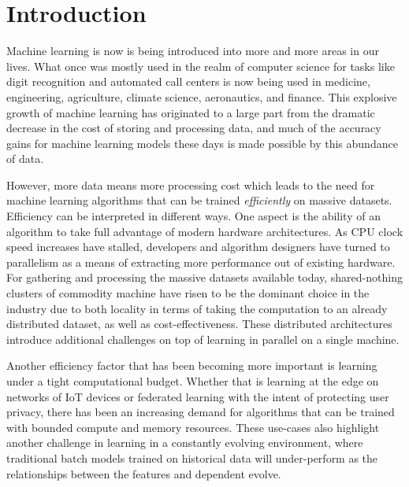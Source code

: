 \chapter{Introduction}

Machine learning is now is being introduced into more and more areas in
our lives. What once was mostly used in the realm of computer science for
tasks like digit recognition and automated call centers is now being used
in medicine, engineering, agriculture, climate science, aeronautics,
and finance. This explosive growth of machine learning has originated
to a large part from the dramatic decrease in the cost of storing and processing
data, and much of the accuracy gains for machine learning models these
days is made possible by this abundance of data.

However, more data means more processing cost which leads to the need for
machine learning algorithms that can be trained \emph{efficiently} on massive
datasets. Efficiency can be interpreted in different ways. One
aspect is the ability of an algorithm to take full advantage of modern
hardware architectures. As CPU clock speed increases have stalled, developers
and algorithm designers have turned to parallelism as a means of
extracting more performance out of existing hardware.
For gathering and processing the massive datasets available today,
shared-nothing clusters of commodity machine have risen to
be the dominant choice in the industry due to both locality
in terms of taking the computation to an already distributed
dataset, as well as cost-effectiveness. These distributed
architectures introduce additional challenges on top of
learning in parallel on a single machine.

Another efficiency factor that has been becoming more important
is learning under a tight computational budget. Whether that
is learning at the edge on networks of IoT devices or federated
learning with the intent of protecting user privacy, there has
been an increasing demand for algorithms that can be trained
with bounded compute and memory resources.
These use-cases also highlight another challenge in learning
in a constantly evolving environment, where traditional batch
models trained on historical data will under-perform as the
relationships between the features and dependent evolve.

